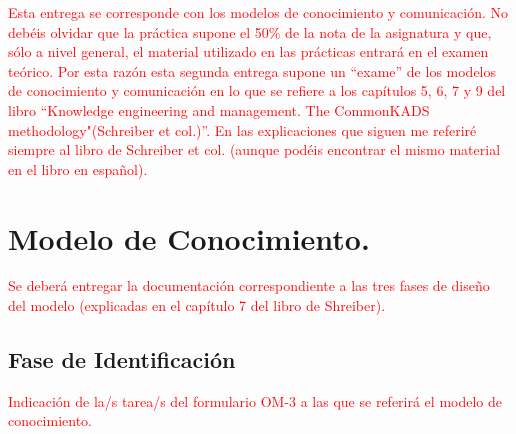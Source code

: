 \documentclass[12pt,a4paper,twoside,spanish]{article}      %
\begin{document}
 \pagestyle{myheadings} 

\setlength{\parindent}{1,5cm} \setlength{\parskip}{0,7cm}


\textcolor {red} {Esta entrega se corresponde con los modelos de conocimiento y comunicación.  No debéis olvidar que la práctica supone el 50\% de la nota de la asignatura y que, sólo a nivel general, el material utilizado en las prácticas entrará en el examen teórico. Por esta razón esta segunda entrega supone un ``exame'' de los modelos de conocimiento y comunicación en lo que se refiere a los capítulos 5, 6, 7 y 9 del libro ``Knowledge engineering and management. The CommonKADS methodology"(Schreiber et col.)''. En las explicaciones que siguen me referiré siempre al libro de Schreiber et col. (aunque podéis encontrar el mismo material en el libro en español).}


\section {Modelo de Conocimiento.}

\textcolor {red} {Se deberá entregar la documentación correspondiente a las tres fases de diseño del modelo (explicadas en el capítulo 7 del libro de Shreiber).}


\subsection{Fase de Identificación}

\textcolor {red} {Indicación de la/s tarea/s del formulario OM-3 a las que se referirá el modelo de conocimiento.}
\end{document}
